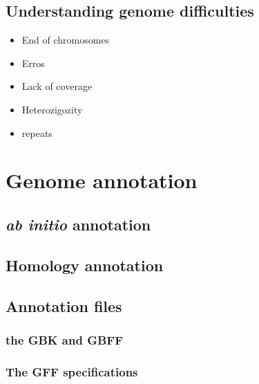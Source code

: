 \documentclass[
  letterpaper,
  DIV=11,
  numbers=noendperiod,
  oneside]{scrreprt}
\begin{document}
\hypertarget{understanding-genome-difficulties}{%
\section{Understanding genome
difficulties}\label{understanding-genome-difficulties}}

\begin{itemize}
\item
  End of chromosomes
\item
  Erros
\item
  Lack of coverage
\item
  Heterozigozity
\item
  repeats
\end{itemize}

\hypertarget{sec-genome-annotation}{%
\chapter{Genome annotation}\label{sec-genome-annotation}}

\hypertarget{ab-initio-annotation}{%
\section{\texorpdfstring{\emph{ab initio}
annotation}{ab initio annotation}}\label{ab-initio-annotation}}

\hypertarget{homology-annotation}{%
\section{Homology annotation}\label{homology-annotation}}

\hypertarget{annotation-files}{%
\section{Annotation files}\label{annotation-files}}

\hypertarget{the-gbk-and-gbff}{%
\subsection{the GBK and GBFF}\label{the-gbk-and-gbff}}

\hypertarget{the-gff-specifications}{%
\subsection{The GFF specifications}\label{the-gff-specifications}}
\end{document}
